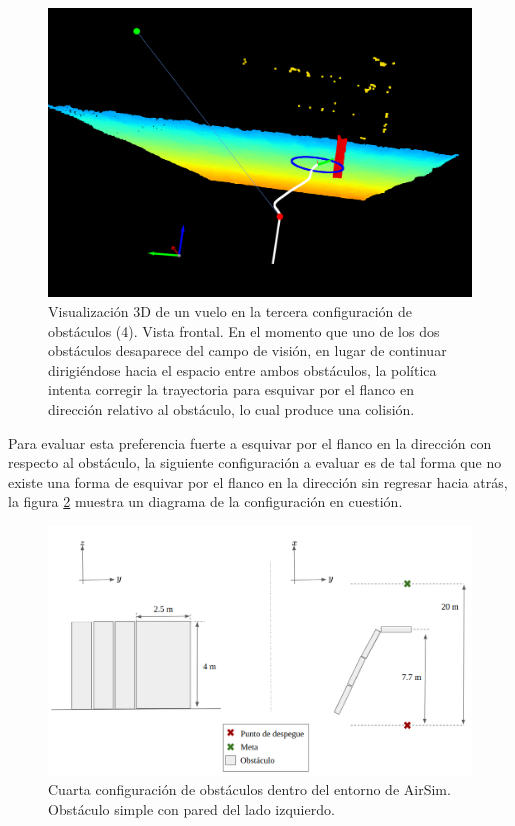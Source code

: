 \begin{figure}[H]
    \centering
    \includegraphics[scale=0.32]{partes/img/depth-parallel-5-front-collision.png}
    \caption[Visualización 3D de un vuelo en la tercera configuración de obstáculos (4). Vista frontal. Colisión.]{Visualización 3D de un vuelo en la tercera configuración de obstáculos (4). Vista frontal. En el momento que uno de los dos obstáculos desaparece del campo de visión, en lugar de continuar dirigiéndose hacia el espacio entre ambos obstáculos, la política intenta corregir la trayectoria para esquivar por el flanco en dirección  relativo al obstáculo, lo cual produce una colisión. }
    \label{fig:depth-parallel-5}
\end{figure}


Para evaluar esta preferencia fuerte a esquivar por el flanco en la dirección  con respecto al obstáculo, la siguiente configuración a evaluar es de tal forma que no existe una forma de esquivar por el flanco en la dirección  sin regresar hacia atrás, la figura \ref{fig:config-4-wall} muestra un diagrama de la configuración en cuestión.

\begin{figure}[H]
    \centering
    \includegraphics[scale=0.35]{partes/img/config-4-left-wall.png}
    \caption[Cuarta configuración de obstáculos dentro del entorno de AirSim.]{Cuarta configuración de obstáculos dentro del entorno de AirSim. Obstáculo simple con pared del lado izquierdo.}
    \label{fig:config-4-wall}
\end{figure}

